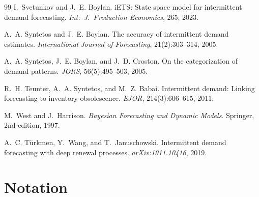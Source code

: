 \documentclass[twocolumn,10pt]{article}
\theoremstyle{definition}
\begin{document}
\begin{thebibliography}{99}
I.~Svetunkov and J.~E. Boylan.
\newblock iETS: State space model for intermittent demand forecasting.
\newblock \emph{Int.\ J.\ Production Economics}, 265, 2023.

A.~A. Syntetos and J.~E. Boylan.
\newblock The accuracy of intermittent demand estimates.
\newblock \emph{International Journal of Forecasting}, 21(2):303--314, 2005.

A.~A. Syntetos, J.~E. Boylan, and J.~D. Croston.
\newblock On the categorization of demand patterns.
\newblock \emph{JORS}, 56(5):495--503, 2005.

R.~H. Teunter, A.~A. Syntetos, and M.~Z. Babai.
\newblock Intermittent demand: Linking forecasting to inventory
  obsolescence.
\newblock \emph{EJOR}, 214(3):606--615, 2011.

M.~West and J.~Harrison.
\newblock \emph{Bayesian Forecasting and Dynamic Models}.
\newblock Springer, 2nd edition, 1997.

A.~C. T\"urkmen, Y.~Wang, and T.~Januschowski.
\newblock Intermittent demand forecasting with deep renewal processes.
\newblock \emph{arXiv:1911.10416}, 2019.

\end{thebibliography}

\appendix
\onecolumn

\section{Notation}\label{app:notation}
\end{document}
